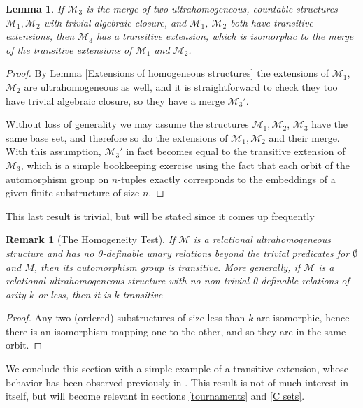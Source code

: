 \documentclass{amsart}
\newtheorem{lemma}[theorem]{Lemma}
\newtheorem{remark}[theorem]{Remark}
\newcommand{\model}{\mathcal{M}}
\begin{document}
\begin{lemma}\label{merge lemma}
    If $\model_3$ is the merge of two ultrahomogeneous, countable structures  $\model_1, \model_2$ with trivial algebraic closure, and $\model_1$, $\model_2$ both have transitive extensions, then $\model_3$ has a transitive extension, which is isomorphic to the merge of the transitive extensions of $\model_1$ and $\model_2$.
\end{lemma}
\begin{proof}
    By Lemma \ref{Extensions of homogeneous structures} the extensions of $\model_1$, $\model_2$ are ultrahomogeneous as well, and it is straightforward to check they too have trivial algebraic closure, so they have a merge $\model_3'$.

    Without loss of generality we may assume the structures $\model_1, \model_2$, $\model_3$ have the same base set, and therefore so do the extensions of $\model_1, \model_2$ and their merge. With this assumption, $\model_3'$ in fact becomes equal to the transitive extension of $\model_3$, which is a simple bookkeeping exercise using the fact that each orbit of the automorphism group on $n$-tuples exactly corresponds to the embeddings of a given finite substructure of size $n$. 
\end{proof}



This last result is trivial, but will be stated since it comes up frequently

\begin{remark}[The Homogeneity Test]\label{homogeneity test}
    If $\mathcal{M}$ is a relational ultrahomogeneous structure and has no 0-definable unary relations beyond the trivial predicates for $\emptyset$ and $M$, then its automorphism group is transitive. More generally, if $\mathcal{M}$ is a relational ultrahomogeneous structure with no non-trivial 0-definable relations of arity $k$ or less, then it is $k$-transitive
\end{remark}
\begin{proof}
    Any two (ordered) substructures of size less than $k$ are isomorphic, hence there is an isomorphism mapping one to the other, and so they are in the same orbit.
\end{proof}


We conclude this section with a simple example of a transitive extension, whose behavior has been observed previously in \cite{huntington1935inter}. This result is not of much interest in itself, but will become relevant in sections \ref{tournaments} and \ref{C sets}.
\end{document}
